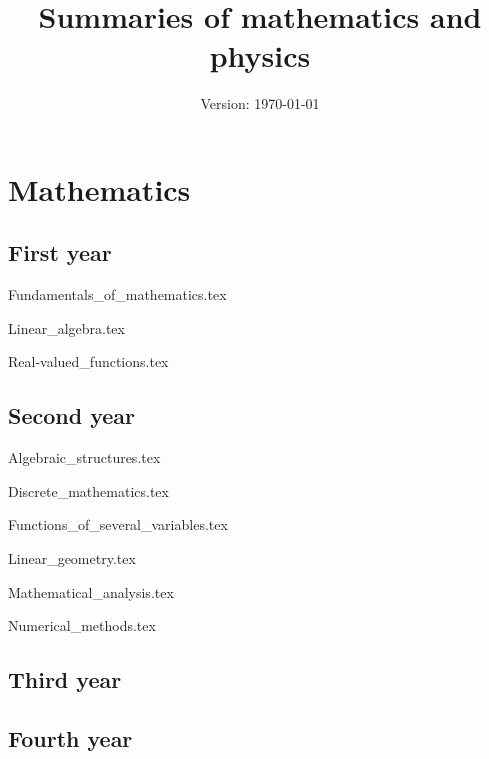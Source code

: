 \documentclass{report}
\title{Summaries of mathematics and physics}
\author{}
\date{Version: \today}
\begin{document}
\maketitle
\newpage
\tableofcontents
\newpage
\part{Mathematics}
    \chapter{First year}
    \newpage
        {Fundamentals_of_mathematics.tex}
        \cleardoublepage    
    
        {Linear_algebra.tex}
        \cleardoublepage
        
        {Real-valued_functions.tex}
        \cleardoublepage
    \chapter{Second year}
    \newpage
        {Algebraic_structures.tex}
        \cleardoublepage
        
        {Discrete_mathematics.tex}
        \cleardoublepage
        
        {Functions_of_several_variables.tex}
        \cleardoublepage
        
        {Linear_geometry.tex}
        \cleardoublepage
        
        {Mathematical_analysis.tex}
        \cleardoublepage
        
        {Numerical_methods.tex}
        \cleardoublepage
    \chapter{Third year}
    \newpage
    \chapter{Fourth year}
    \newpage
        
\end{document}
